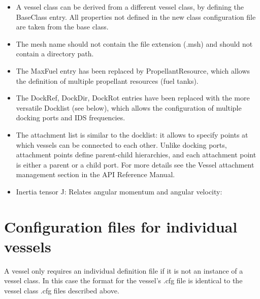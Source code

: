 \documentclass[Orbiter Developer Manual.tex]{subfiles}
\begin{document}
\begin{itemize}
\item A vessel class can be derived from a different vessel class, by defining the BaseClass entry. All properties not defined in the new class configuration file are taken from the base class.
\item The mesh name should not contain the file extension (.msh)  and should not contain a directory path.
\item The MaxFuel entry has been replaced by PropellantResource, which allows the definition of multiple propellant resources (fuel tanks).
\item The DockRef, DockDir, DockRot entries have been replaced with the more versatile Docklist (see below), which allows the configuration of multiple docking ports and IDS frequencies.
\item The attachment list is similar to the docklist: it allows to specify points at which vessels can be connected to each other. Unlike docking ports, attachment points define parent-child hierarchies, and each attachment point is either a parent or a child port. For more details see the Vessel attachment management section in the API Reference Manual.
\item Inertia tensor J: Relates angular momentum and angular velocity:
\end{itemize}

\noindent
{}


\section{Configuration files for individual vessels}
A vessel only requires an individual definition file if it is not an instance of a vessel class. In this case the format for the vessel’s .cfg file is identical to the vessel class .cfg files described above.
\end{document}
